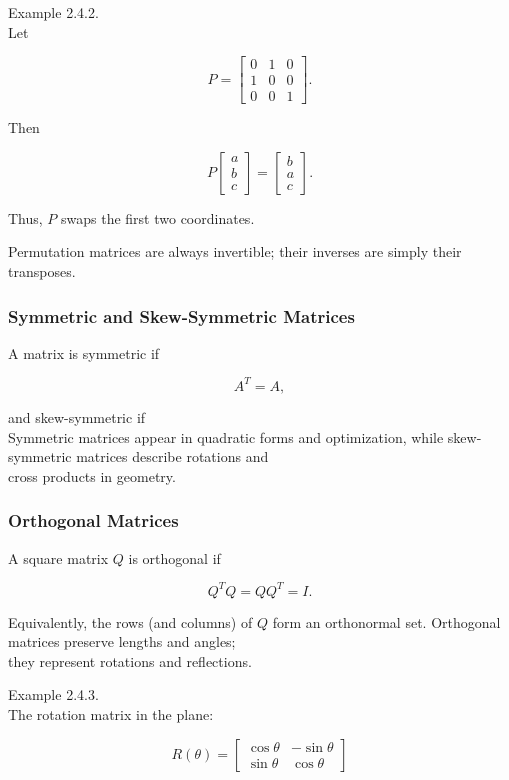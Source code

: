 \documentclass[
  12pt,
  a4paper,
]{article}
\begin{document}
Example 2.4.2.\\
Let

\[P = \begin{bmatrix}
0 & 1 & 0 \\
1 & 0 & 0 \\
0 & 0 & 1
\end{bmatrix}.\]

Then

\[P\begin{bmatrix}
a \\
b \\
c \end{bmatrix} =
\begin{bmatrix} b \\
a \\
c \end{bmatrix}.\]

Thus, \(P\) swaps the first two coordinates.

Permutation matrices are always invertible; their inverses are simply
their transposes.

\subsubsection{Symmetric and Skew-Symmetric
Matrices}\label{symmetric-and-skew-symmetric-matrices}

A matrix is symmetric if

\[A^T = A,\]

and skew-symmetric if\\
Symmetric matrices appear in quadratic forms and optimization, while
skew-symmetric matrices describe rotations and\\
cross products in geometry.

\subsubsection{Orthogonal Matrices}\label{orthogonal-matrices}

A square matrix \(Q\) is orthogonal if

\[Q^T Q = QQ^T = I.\]

Equivalently, the rows (and columns) of \(Q\) form an orthonormal set.
Orthogonal matrices preserve lengths and angles;\\
they represent rotations and reflections.

Example 2.4.3.\\
The rotation matrix in the plane:

\[R(\theta) = \begin{bmatrix}
\cos\theta & -\sin\theta \\
\sin\theta & \cos\theta
\end{bmatrix}\]
\end{document}
